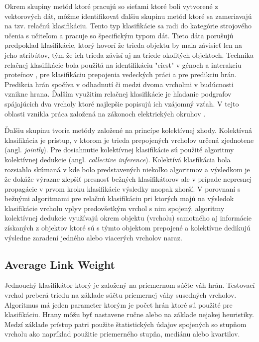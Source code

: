 \documentclass[slovak,master,dept460,male,cpp,cpdeclaration]{diploma}
\begin{document}
Okrem skupiny metód ktoré pracujú so sieťami ktoré boli vytvorené z vektorových dát, môžme identifikovať ďalšiu skupinu metód ktoré sa zameriavajú na tzv. relačnú klasifikáciu. Tento typ klasifikácie sa radi do kategórie strojového učenia s učiteľom a pracuje so špecifickým typom dát. Tieto dáta porušujú predpoklad klasifikácie, ktorý hovorí že trieda objektu by mala závisieť len na jeho atribútov, tým že ich trieda závisí aj na triede okolitých objektoch. Technika relačnej klasifikácie bola použitá na identifikáciu "ciest" v génoch a interakciu proteínov \cite{protien_interaction}, pre klasifikáciu prepojenia vedeckých práci \cite{reseatch_llinks} a pre predikciu hrán. Predikcia hrán spočíva v odhadnutí či medzi dvoma vrcholmi v budúcnosti vznikne hrana. Ďalším využitím relačnej klasifikácie je hľadanie podgrafov spájajúcich dva vrcholy ktoré najlepšie popisujú ich vzájomný vzťah. V tejto oblasti vznikla práca založená na zákonoch elektrických okruhov \cite{subgraph_induction}.

Ďalšiu skupinu tvoria metódy založené na princípe kolektívnej zhody. Kolektívná klasifikácia je prístup, v ktorom je trieda prepojených vrcholov určená zjednotene (angl. \textit{jointly}). Pre dosiahnutie kolektívnej klasifikácie sú použité algoritmy kolektívnej dedukcie (angl. \textit{collective inference}). Kolektívá klasfikácia bola rozsiahlo skúmaná v \cite{collective_classification} kde bolo predstavených niekoľko algoritmov a výsledkom je že dokáže výrazne zlepšiť presnosť bežných klasifikátorov ale v prípade nepresnej propagácie v prvom kroku klasifikácie výsledky naopak zhorší. V porovnaní s bežnými algoritmami pre relačnú klasifikáciu pri ktorých majú na výsledok klasifikácie vrcholu vplyv predovšetkým vrchol s nim spojený, algoritmy kolektívnej dedukcie využívajú okrem objektu (vrcholu) samotného aj informácie získaných z objektov ktoré sú s týmto objektom prepojené a kolektívne dedikujú výsledne zaradení jedného alebo viacerých vrcholov naraz.

\subsection{Average Link Weight}
Jednouchý klasifikátor ktorý je založený na priemernom súčte váh hrán. Testovací vrchol preberá triedu na základe súčtu priemernej váhy susedných vrcholov. Algoritmus má jeden parameter ktorým je počet hrán ktoré sú použité pre klasifikáciu. Hrany môžu byť nastavene ručne alebo na základe nejakej heuristiky. Medzí základe prístup patri použite štatistických údajov spojených so stupňom vrcholu ako napríklad použitie priemerného stupňa, mediánu alebo kvartilov.
\end{document}
